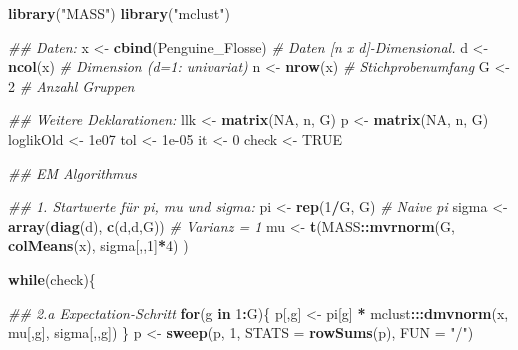 \documentclass[
  ngerman,
]{book}
\newenvironment{Shaded}{\begin{snugshade}}{\end{snugshade}}
\newcommand{\CommentTok}[1]{\textcolor[rgb]{0.56,0.35,0.01}{\textit{#1}}}
\newcommand{\ControlFlowTok}[1]{\textcolor[rgb]{0.13,0.29,0.53}{\textbf{#1}}}
\newcommand{\DataTypeTok}[1]{\textcolor[rgb]{0.13,0.29,0.53}{#1}}
\newcommand{\DecValTok}[1]{\textcolor[rgb]{0.00,0.00,0.81}{#1}}
\newcommand{\FloatTok}[1]{\textcolor[rgb]{0.00,0.00,0.81}{#1}}
\newcommand{\KeywordTok}[1]{\textcolor[rgb]{0.13,0.29,0.53}{\textbf{#1}}}
\newcommand{\NormalTok}[1]{#1}
\newcommand{\OperatorTok}[1]{\textcolor[rgb]{0.81,0.36,0.00}{\textbf{#1}}}
\newcommand{\OtherTok}[1]{\textcolor[rgb]{0.56,0.35,0.01}{#1}}
\newcommand{\StringTok}[1]{\textcolor[rgb]{0.31,0.60,0.02}{#1}}
\begin{document}
\begin{Shaded}
\begin{Highlighting}[]
\KeywordTok{library}\NormalTok{(}\StringTok{"MASS"}\NormalTok{)}
\KeywordTok{library}\NormalTok{(}\StringTok{"mclust"}\NormalTok{)}

\CommentTok{## Daten:}
\NormalTok{x <-}\StringTok{ }\KeywordTok{cbind}\NormalTok{(Penguine_Flosse) }\CommentTok{# Daten [n x d]-Dimensional. }
\NormalTok{d <-}\StringTok{ }\KeywordTok{ncol}\NormalTok{(x)                }\CommentTok{# Dimension (d=1: univariat)}
\NormalTok{n <-}\StringTok{ }\KeywordTok{nrow}\NormalTok{(x)                }\CommentTok{# Stichprobenumfang}
\NormalTok{G <-}\StringTok{ }\DecValTok{2}                      \CommentTok{# Anzahl Gruppen}

\CommentTok{## Weitere Deklarationen:}
\NormalTok{llk       <-}\StringTok{ }\KeywordTok{matrix}\NormalTok{(}\OtherTok{NA}\NormalTok{, n, G)}
\NormalTok{p         <-}\StringTok{ }\KeywordTok{matrix}\NormalTok{(}\OtherTok{NA}\NormalTok{, n, G)  }
\NormalTok{loglikOld <-}\StringTok{ }\FloatTok{1e07}
\NormalTok{tol       <-}\StringTok{ }\FloatTok{1e-05}
\NormalTok{it        <-}\StringTok{ }\DecValTok{0}
\NormalTok{check     <-}\StringTok{ }\OtherTok{TRUE} 


\CommentTok{## EM Algorithmus}

\CommentTok{## 1. Startwerte für pi, mu und sigma:}
\NormalTok{pi    <-}\StringTok{ }\KeywordTok{rep}\NormalTok{(}\DecValTok{1}\OperatorTok{/}\NormalTok{G, G)              }\CommentTok{# Naive pi}
\NormalTok{sigma <-}\StringTok{ }\KeywordTok{array}\NormalTok{(}\KeywordTok{diag}\NormalTok{(d), }\KeywordTok{c}\NormalTok{(d,d,G)) }\CommentTok{# Varianz = 1}
\NormalTok{mu    <-}\StringTok{ }\KeywordTok{t}\NormalTok{(MASS}\OperatorTok{::}\KeywordTok{mvrnorm}\NormalTok{(G, }\KeywordTok{colMeans}\NormalTok{(x), sigma[,,}\DecValTok{1}\NormalTok{]}\OperatorTok{*}\DecValTok{4}\NormalTok{) )}

\ControlFlowTok{while}\NormalTok{(check)\{}
  
  \CommentTok{## 2.a Expectation-Schritt }
  \ControlFlowTok{for}\NormalTok{(g }\ControlFlowTok{in} \DecValTok{1}\OperatorTok{:}\NormalTok{G)\{}
\NormalTok{    p[,g] <-}\StringTok{ }\NormalTok{pi[g] }\OperatorTok{*}\StringTok{ }\NormalTok{mclust}\OperatorTok{:::}\KeywordTok{dmvnorm}\NormalTok{(x, mu[,g], sigma[,,g])}
\NormalTok{  \}}
\NormalTok{  p <-}\StringTok{ }\KeywordTok{sweep}\NormalTok{(p, }\DecValTok{1}\NormalTok{, }\DataTypeTok{STATS =} \KeywordTok{rowSums}\NormalTok{(p), }\DataTypeTok{FUN =} \StringTok{"/"}\NormalTok{)}
  

\end{Highlighting}
\end{Shaded}
\end{document}
